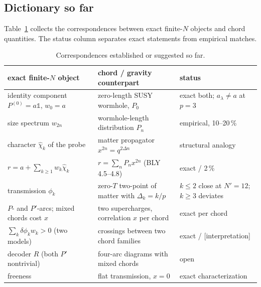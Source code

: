 \documentclass[11pt]{article}
\newcommand{\Np}{N'}
\newcommand{\one}{\mathds 1}
\newcommand{\tagbox}[2]{\textsf{\small\color{#1}[#2]}}
\newcommand{\INTERP}{\tagbox{cconj}{interpretation}}
\theoremstyle{remark}
\begin{document}
\subsection{Dictionary so far}
Table~\ref{tab:dictionary} collects the correspondences between exact finite-$N$ objects and chord quantities. The
status column separates exact statements from empirical matches.
\begin{table}[h]
\centering\small
\begin{tabular}{@{}>{\raggedright\arraybackslash}p{}>{\raggedright\arraybackslash}p{}>{\raggedright\arraybackslash}p{}@{}}
\toprule
exact finite-$N$ object & chord / gravity counterpart & status\\
\midrule
identity component $P^{(0)}=a\one$, $w_0=a$ & zero-length SUSY wormhole, $P_0$ & exact both; $a_\lambda\neq a$ at $p=3$\\
size spectrum $w_{2n}$ & wormhole-length distribution $P_n$ & empirical, 10--20\,\%\\
character $\hat\chi_k$ of the probe & matter propagator $x^{2n}=q^{2\Delta n}$ & structural analogy\\
$r=a+\sum_{k\ge1}w_k\hat\chi_k$ & $r=\sum_nP_nx^{2n}$ (BLY 4.5--4.8) & exact / 2\,\%\\
transmission $\phi_k$ & zero-$T$ two-point of matter with $\Delta_k=k/p$ & $k\le2$ close at $\Np=12$; $k\ge3$ deviates\\
$P$- and $P'$-arcs; mixed chords cost $x$ & two supercharges, correlation $x$ per chord & exact per chord\\
$\sum_k\delta\phi_kw_k>0$ (two models) & crossings between two chord families & exact / \INTERP\\
decoder $R$ (both $P'$ nontrivial) & four-arc diagrams with mixed chords & open\\
freeness & flat transmission, $x=0$ & exact characterization\\
\bottomrule
\end{tabular}
\caption{Correspondences established or suggested so far.}
\label{tab:dictionary}
\end{table}
\end{document}
